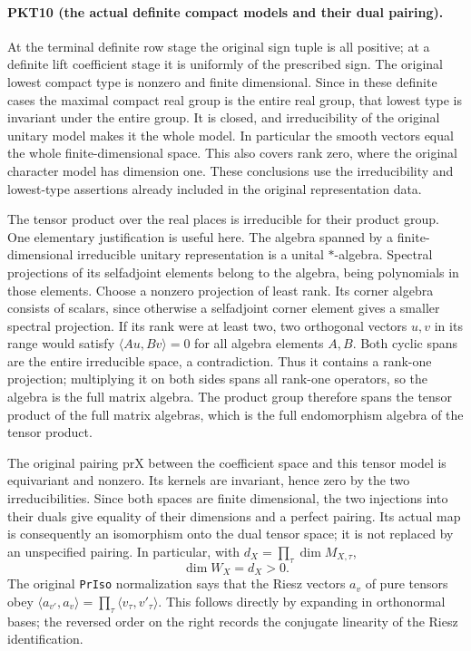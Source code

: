 \paragraph{PKT10 (the actual definite compact models and their dual pairing).}\label{claim:PKT10}
At the terminal definite row stage the original sign tuple is all positive;
at a definite lift coefficient stage it is uniformly of the prescribed sign.
The original lowest compact type is nonzero and finite dimensional.  Since
in these definite cases the maximal compact real group is the entire real
group, that lowest type is invariant under the entire group.  It is closed,
and irreducibility of the original unitary model makes it the whole model.
In particular the smooth vectors equal the whole finite-dimensional space.
This also covers rank zero, where the original character model has dimension
one.  These conclusions use the irreducibility and lowest-type assertions
already included in the original representation data.

The tensor product over the real places is irreducible for their product
group.  One elementary justification is useful here.  The algebra spanned
by a finite-dimensional irreducible unitary representation is a unital
$*$-algebra.  Spectral projections of its selfadjoint elements belong to the
algebra, being polynomials in those elements.  Choose a nonzero projection
of least rank.  Its corner algebra consists of scalars, since otherwise a
selfadjoint corner element gives a smaller spectral projection.  If its rank
were at least two, two orthogonal vectors $u,v$ in its range would satisfy
$\langle Au,Bv\rangle=0$ for all algebra elements $A,B$.  Both cyclic spans
are the entire irreducible space, a contradiction.  Thus it contains a
rank-one projection; multiplying it on both sides spans all rank-one
operators, so the algebra is the full matrix algebra.  The product group
therefore spans the tensor product of the full matrix algebras, which is the
full endomorphism algebra of the tensor product.

The original pairing $\mathrm{prX}$ between the coefficient space and this
tensor model is equivariant and nonzero.  Its kernels are invariant, hence
zero by the two irreducibilities.  Since both spaces are finite dimensional,
the two injections into their duals give equality of their dimensions and
a perfect pairing.  Its actual map is consequently an isomorphism onto the
dual tensor space; it is not replaced by an unspecified pairing.  In
particular, with $d_X=\prod_\tau\dim M_{X,\tau}$,
\[
 \dim W_X=d_X>0.\tag{PKT.8}
\]
The original \texttt{PrIso} normalization says that the Riesz vectors $a_v$
of pure tensors obey
$\langle a_{v'},a_v\rangle=\prod_\tau\langle v_\tau,v'_\tau\rangle$.
This follows directly by expanding in orthonormal bases; the reversed order
on the right records the conjugate linearity of the Riesz identification.


